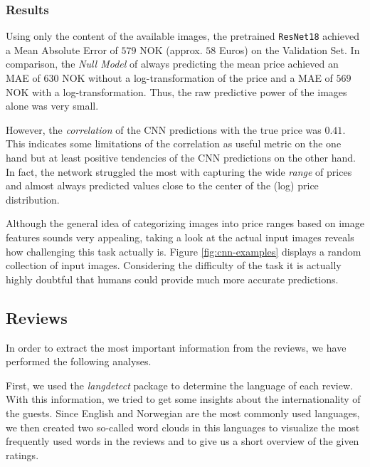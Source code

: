 \documentclass[12pt, letterpaper]{article}
\begin{document}
\subsubsection{Results}

Using only the content of the available images, the pretrained \texttt{ResNet18} achieved a Mean Absolute Error of $579$ NOK (approx. $58$ Euros) on the Validation Set.
In comparison, the \emph{Null Model} of always predicting the mean price achieved an MAE of $630$ NOK without a log-transformation of the price and a MAE of $569$ NOK with a log-transformation.
Thus, the raw predictive power of the images alone was very small.

However, the \emph{correlation} of the CNN predictions with the true price was $0.41$.
This indicates some limitations of the correlation as useful metric on the one hand but at least positive tendencies of the CNN predictions on the other hand.
In fact, the network struggled the most with capturing the wide \emph{range} of prices and almost always predicted values close to the center of the (log) price distribution.

Although the general idea of categorizing images into price ranges based on image features sounds very appealing, taking a look at the actual input images reveals how challenging this task actually is.
Figure \ref{fig:cnn-examples} displays a random collection of input images.
Considering the difficulty of the task it is actually highly doubtful that humans could provide much more accurate predictions.

\subsection{Reviews}


In order to extract the most important information from the reviews, we have performed the following analyses.

First, we used the \textit{langdetect} package to determine the language of each review.
With this information, we tried to get some insights about the internationality of the guests.
Since English and Norwegian are the most commonly used languages, we then created two so-called word clouds in this languages to visualize the most frequently used words in the reviews and to give us a short overview of the given ratings.
\end{document}

